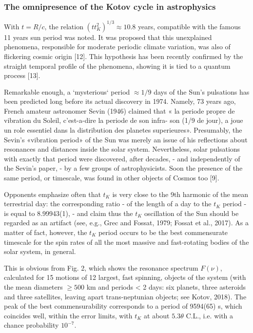 \documentclass[twoside,draft]{article}
\begin{document}
\begin{sloppypar}
{\subsubsection{The omnipresence of the Kotov cycle in astrophysics}

With $t = R/c$, the relation $(t t_{K}^2)^{1/3} \approx 10.8$ years, compatible with the famous 11 years sun period
was noted. It was proposed that this unexplained phenomena, responsible for moderate periodic
climate variation, was also of flickering cosmic origin [12]. This hypothesis has been recently
confirmed by the straight temporal profile of the phenomena, showing it is tied to a quantum
process [13].

Remarkable enough, a `mysterious` period $\approx 1/9$ days of the Sun's pulsations has been predicted
long before its actual discovery in 1974. Namely, 73 years ago, French amateur astronomer Sevin
(1946) claimed that « la periode propre de vibration du Soleil, c'est-a-dire la periode de son infra-
son (1/9 de jour), a joue un role essentiel dans la distribution des planetes superieures». Presumably,
the Sevin's «vibration period» of the Sun was merely an issue of his reflections about resonances
and distances inside the solar system. Nevertheless, solar pulsations with exactly that period were
discovered, after decades, - and independently of the Sevin's paper, - by a few groups of
astrophysicists. Soon the presence of the same period, or timescale, was found in other objects of
Cosmos too [9].

Opponents emphasize often that $t_{K}$ is very close to the 9th harmonic of the mean terrestrial day: the corresponding ratio - of the length of a day to the $t_{K}$ period - is equal to 8.99943(1), - and claim
thus the $t_{K}$ oscillation of the Sun should be regarded as an artifact (see, e.g., Grec and Fossat, 1979;
Fossat et al., 2017). As a matter of fact, however, the $t_{K}$ period occurs to be the best commensurate
timescale for the spin rates of all the most massive and fast-rotating bodies of the solar system, in
general.

This is obvious from Fig. 2, which shows the resonance spectrum $F( \nu )$, calculated for 15
motions of 12 largest, fast spinning, objects of the system (with the mean diameters $\geq 500$ km and
periods < 2 days: six planets, three asteroids and three satellites, leaving apart trans-neptunian
objects; see Kotov, 2018). The peak of the best commensurability corresponds to a period of
9594(65) s, which coincides well, within the error limits, with $t_K$ at about $5.3 \theta$ C.L., i.e. with a
chance probability $10^{-7}$.

}
\end{sloppypar}
\end{document}
